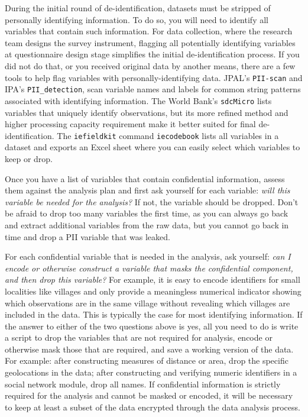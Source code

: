 During the initial round of de-identification,
datasets must be stripped of personally identifying information.
To do so, you will need to identify all variables that contain such information.
For data collection, where the research team designs the survey instrument,
flagging all potentially identifying variables at questionnaire design stage
simplifies the initial de-identification process.
If you did not do that, or you received original data by another means,
there are a few tools to help flag variables with personally-identifying data.
JPAL's \texttt{PII-scan} and
IPA's \texttt{PII\_detection},
scan variable names and labels for common string patterns associated with identifying information.
The World Bank's \texttt{sdcMicro}
lists variables that uniquely identify observations,
but its more refined method and
higher processing capacity requirement make it better suited for final de-identification.
The \texttt{iefieldkit} command \texttt{iecodebook}
lists all variables in a dataset and exports an Excel sheet
where you can easily select which variables to keep or drop.

Once you have a list of variables that contain confidential information,
assess them against the analysis plan and first ask yourself for each variable:
\textit{will this variable be needed for the analysis?}
If not, the variable should be dropped.
Don't be afraid to drop too many variables the first time,
as you can always go back and extract additional variables from the raw data,
but you cannot go back in time and drop a PII variable that was leaked.

For each confidential variable that is needed in the analysis, ask yourself:
\textit{can I encode or otherwise construct a variable that masks the confidential component, and
	then drop this variable?}
For example, it is easy to encode identifiers for small localities like villages
and only provide a meaningless numerical indicator
showing which observations are in the same village
without revealing which villages are included in the data.
This is typically the case for most identifying information.
If the answer to either of the two questions above is yes,
all you need to do is write a script to drop the variables that are not required for analysis,
encode or otherwise mask those that are required,
and save a working version of the data.
For example:
after constructing measures of distance or area,
drop the specific geolocations in the data;
after constructing and verifying numeric identifiers in
a social network module, drop all names.
If confidential information is strictly required for the analysis and cannot be
masked or encoded,
it will be necessary to keep at least a subset of the data encrypted through
the data analysis process.

